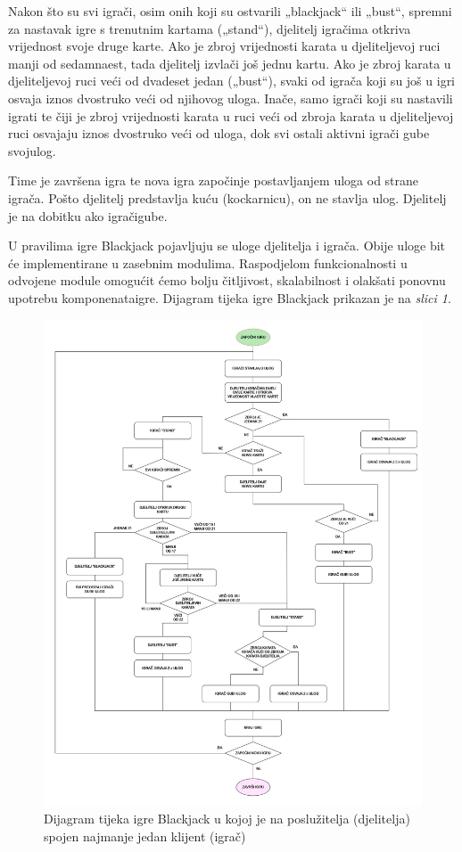 \documentclass{IEEEcsmag}
\begin{document}
Nakon što su svi igrači, osim onih koji su ostvarili „blackjack“ ili „bust“, spremni za nastavak igre s trenutnim kartama („stand“), djelitelj igračima otkriva vrijednost svoje druge karte. Ako je zbroj vrijednosti karata u djeliteljevoj ruci manji od sedamnaest, tada djelitelj izvlači još jednu kartu. Ako je zbroj karata u djeliteljevoj ruci veći od dvadeset jedan („bust“), svaki od igrača koji su još u igri osvaja iznos dvostruko veći od njihovog uloga. Inače, samo igrači koji su nastavili igrati te čiji je zbroj vrijednosti karata u ruci veći od zbroja karata u djeliteljevoj ruci osvajaju iznos dvostruko veći od uloga, dok svi ostali aktivni igrači gube svoj\break ulog. 

Time je završena igra te nova igra započinje postavljanjem uloga od strane igrača. Pošto djelitelj predstavlja kuću (kockarnicu), on ne stavlja ulog. Djelitelj je na dobitku ako igrači\break gube.

U pravilima igre Blackjack pojavljuju se uloge djelitelja i igrača. Obije uloge bit će implementirane u zasebnim modulima. Raspodjelom funkcionalnosti u odvojene module omogućit ćemo bolju čitljivost, skalabilnost i olakšati ponovnu upotrebu komponenata\break igre. Dijagram tijeka igre Blackjack prikazan je na \textit{slici 1}.

\begin{figure}[htbp]
\centering
\includegraphics[width=\textwidth]{flow-diagram.jpg}
\caption{Dijagram tijeka igre Blackjack u kojoj je na poslužitelja (djelitelja) spojen najmanje jedan klijent (igrač)}
\vspace{-5pt}
\end{figure}
\end{document}
